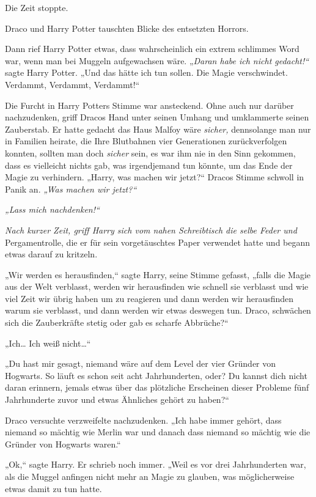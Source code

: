 {Die Zeit stoppte.

Draco und Harry Potter tauschten Blicke des entsetzten Horrors.

Dann rief Harry Potter etwas, dass wahrscheinlich ein extrem schlimmes Word war, wenn man bei Muggeln aufgewachsen wäre. „\emph{Daran habe ich nicht gedacht!“} sagte Harry Potter. „Und das hätte ich tun sollen. Die Magie verschwindet. Verdammt, Verdammt, Verdammt!“

Die Furcht in Harry Potters Stimme war ansteckend. Ohne auch nur darüber nachzudenken, griff Dracos Hand unter seinen Umhang und umklammerte seinen Zauberstab. Er hatte gedacht das Haus Malfoy wäre \emph{sicher,} dennsolange man nur in Familien heirate, die Ihre Blutbahnen vier Generationen zurückverfolgen konnten, sollten man doch \emph{sicher} sein, es war ihm nie in den Sinn gekommen, dass es vielleicht nichts gab, was irgendjemand tun könnte, um das Ende der Magie zu verhindern. „Harry, was machen wir jetzt?“ Dracos Stimme schwoll in Panik an. \emph{„Was machen wir jetzt?“}

\emph{„Lass mich nachdenken!“}

\emph{Nach kurzer Zeit, griff Harry sich vom nahen Schreibtisch die selbe Feder und} Pergamentrolle, die er für sein vorgetäuschtes Paper verwendet hatte und begann etwas darauf zu kritzeln.

„Wir werden es herausfinden,“ sagte Harry, seine Stimme gefasst, „falls die Magie aus der Welt verblasst, werden wir herausfinden wie schnell sie verblasst und wie viel Zeit wir übrig haben um zu reagieren und dann werden wir herausfinden warum sie verblasst, und dann werden wir etwas deswegen tun. Draco, schwächen sich die Zauberkräfte stetig oder gab es scharfe Abbrüche?“

„Ich… Ich weiß nicht…“

„Du hast mir gesagt, niemand wäre auf dem Level der vier Gründer von Hogwarts. So läuft es schon seit acht Jahrhunderten, oder? Du kannst dich nicht daran erinnern, jemals etwas über das plötzliche Erscheinen dieser Probleme fünf Jahrhunderte zuvor und etwas Ähnliches gehört zu haben?“

Draco versuchte verzweifelte nachzudenken. „Ich habe immer gehört, dass niemand so mächtig wie Merlin war und danach dass niemand so mächtig wie die Gründer von Hogwarts waren.“

„Ok,“ sagte Harry. Er schrieb noch immer. „Weil es vor drei Jahrhunderten war, als die Muggel anfingen nicht mehr an Magie zu glauben, was möglicherweise etwas damit zu tun hatte.

}
